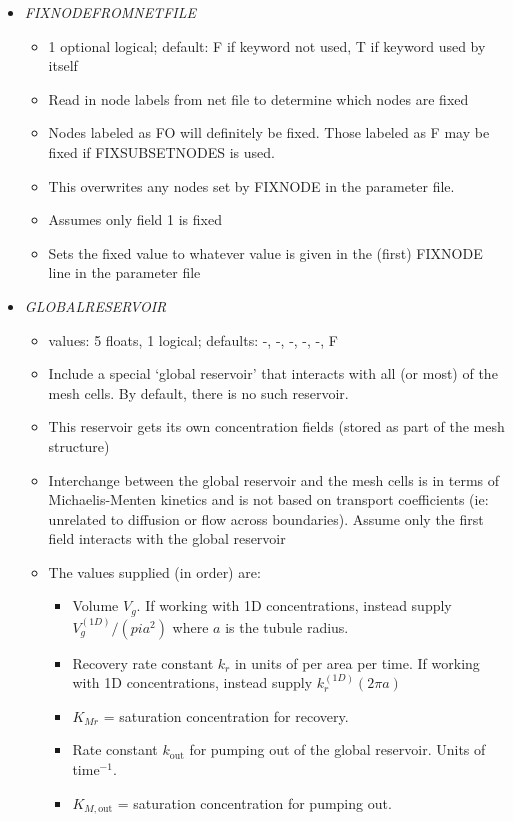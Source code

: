 \documentclass[12pt]{article}
\begin{document}
\begin{itemize}
\begin{itemize}
\end{itemize}
%
\item {\it FIXNODEFROMNETFILE}
\begin{itemize}
	\item 1 optional logical; default: F if keyword not used, T if keyword used by itself
	\item Read in node labels from net file to determine which nodes are fixed 
	\item Nodes labeled as FO will definitely be fixed. Those labeled as F may be fixed if FIXSUBSETNODES is used.
	\item This overwrites any nodes set by FIXNODE in the parameter file. 
	\item Assumes only field 1 is fixed
	\item Sets the fixed value to whatever value is given in the (first) FIXNODE line in the parameter file
\end{itemize}
%
\item {\it GLOBALRESERVOIR}
\begin{itemize}
	\item values: 5 floats, 1 logical; defaults: -, -, -, -, -, F
	\item Include a special `global reservoir' that interacts with all (or most) of the mesh cells. By default, there is no such reservoir.
	\item This reservoir gets its own concentration fields (stored as part of the mesh structure)
	\item Interchange between the global reservoir and the mesh cells is in terms of Michaelis-Menten kinetics and is not based on transport coefficients (ie: unrelated to diffusion or flow across boundaries). Assume only the first field interacts with the global reservoir
	\item The values supplied (in order) are:
	\begin{itemize}
		\item Volume $V_g$. If working with 1D concentrations, instead supply $V_g^{(1D)}/(pi a^2)$ where $a$ is the tubule radius.
		\item Recovery rate constant $k_r$ in units of per area per time. If working with 1D concentrations, instead supply $k_r^{(1D)} (2\pi a)$
		\item $K_{Mr}$ = saturation concentration for recovery. 
		\item Rate constant $k_\text{out}$ for pumping out of the global reservoir. Units of time$^{-1}$.
		\item $K_{M,\text{out}}$ = saturation concentration for pumping out.

\end{itemize}
\end{itemize}
\end{itemize}
\end{document}
